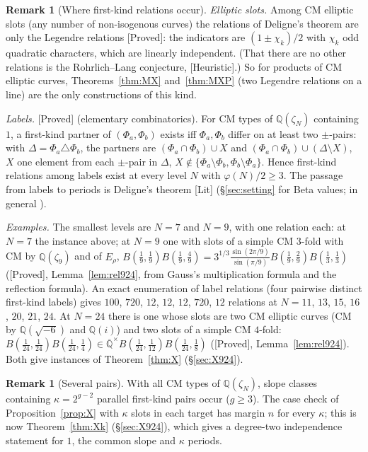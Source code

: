 \documentclass[11pt]{amsart}
\theoremstyle{definition}
\newtheorem{remark}[theorem]{Remark}
\newcommand{\Qb}{\overline{\mathbb{Q}}}
\newcommand{\Q}{\mathbb{Q}}
\newcommand{\lab}[1]{\textup{[#1]}}
\begin{document}
\begin{remark}[Where first-kind relations occur]\label{rem:where}
\emph{Elliptic slots.} Among CM elliptic slots (any number of non-isogenous curves) the relations of Deligne's theorem
are only the Legendre relations \lab{Proved}: the indicators are $(1\pm\chi_k)/2$ with $\chi_k$ odd quadratic characters,
which are linearly independent. (That there are no other relations is the Rohrlich--Lang conjecture, \lab{Heuristic}.)
So for products of CM elliptic curves, Theorems~\ref{thm:MX} and~\ref{thm:MXP} (two Legendre relations on a line) are the only
constructions of this kind.

\emph{Labels.} \lab{Proved} (elementary combinatorics). For CM types of $\Q(\zeta_N)$ containing $1$, a first-kind
partner of $(\Phi_a,\Phi_b)$ exists iff $\Phi_a,\Phi_b$ differ on at least two $\pm$-pairs: with
$\Delta=\Phi_a\triangle\Phi_b$, the partners are $(\Phi_a\cap\Phi_b)\cup X$ and $(\Phi_a\cap\Phi_b)\cup(\Delta\setminus X)$, $X$
one element from each $\pm$-pair in $\Delta$, $X\notin\{\Phi_a\setminus\Phi_b,\Phi_b\setminus\Phi_a\}$. Hence first-kind
relations among labels exist at every level $N$ with $\varphi(N)/2\ge3$. The passage from labels to periods is Deligne's
theorem \lab{Lit} (\S\ref{sec:setting} for Beta values; in general \cite{De82}).

\emph{Examples.} The smallest levels are $N=7$ and $N=9$, with one relation each: at $N=7$ the instance above; at $N=9$
one with slots of a simple CM $3$-fold with CM by $\Q(\zeta_9)$ and of $E_\rho$,
$B(\tfrac19,\tfrac19)B(\tfrac19,\tfrac49)=3^{1/3}\frac{\sin(2\pi/9)}{\sin(\pi/9)}B(\tfrac19,\tfrac29)B(\tfrac13,\tfrac13)$
(\lab{Proved}, Lemma~\ref{lem:rel924}, from Gauss's multiplication formula and the reflection formula). An exact enumeration of label relations (four pairwise
distinct first-kind labels) gives $100$, $720$, $12$, $12$, $12$, $720$, $12$ relations at $N=11$, $13$, $15$, $16$, $20$,
$21$, $24$. At $N=24$ there is one whose slots are two CM elliptic curves (CM by $\Q(\sqrt{-6})$ and $\Q(i)$) and two slots
of a simple CM $4$-fold: $B(\tfrac1{24},\tfrac1{24})B(\tfrac1{24},\tfrac14)\in\Qb^\times
B(\tfrac1{24},\tfrac1{12})B(\tfrac1{24},\tfrac18)$ (\lab{Proved}, Lemma~\ref{lem:rel924}). Both give instances of
Theorem~\ref{thm:X} (\S\ref{sec:X924}).
\end{remark}

\begin{remark}[Several pairs]\label{rem:several}
With all CM types of $\Q(\zeta_N)$, slope classes containing $\kappa=2^{g-2}$ parallel first-kind pairs occur ($g\ge3$).
The case check of Proposition~\ref{prop:X} with $\kappa$ slots in each target has margin $n$ for every $\kappa$; this is now
Theorem~\ref{thm:Xk} (\S\ref{sec:X924}), which gives a degree-two independence statement for $1$, the common slope and
$\kappa$ periods.
\end{remark}
\end{document}

